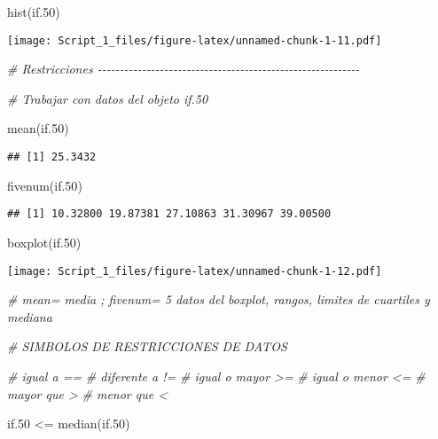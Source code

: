 \documentclass[
]{article}
\newenvironment{Shaded}{\begin{snugshade}}{\end{snugshade}}
\newcommand{\CommentTok}[1]{\textcolor[rgb]{0.56,0.35,0.01}{\textit{#1}}}
\newcommand{\FloatTok}[1]{\textcolor[rgb]{0.00,0.00,0.81}{#1}}
\newcommand{\FunctionTok}[1]{\textcolor[rgb]{0.00,0.00,0.00}{#1}}
\newcommand{\NormalTok}[1]{#1}
\newcommand{\SpecialCharTok}[1]{\textcolor[rgb]{0.00,0.00,0.00}{#1}}
\begin{document}
\begin{Shaded}
\begin{Highlighting}[]
\FunctionTok{hist}\NormalTok{(if}\FloatTok{.50}\NormalTok{)}
\end{Highlighting}
\end{Shaded}

\texttt{[image: Script\_1\_files/figure-latex/unnamed-chunk-1-11.pdf]}

\begin{Shaded}
\begin{Highlighting}[]
\CommentTok{\# Restricciones {-}{-}{-}{-}{-}{-}{-}{-}{-}{-}{-}{-}{-}{-}{-}{-}{-}{-}{-}{-}{-}{-}{-}{-}{-}{-}{-}{-}{-}{-}{-}{-}{-}{-}{-}{-}{-}{-}{-}{-}{-}{-}{-}{-}{-}{-}{-}{-}{-}{-}{-}{-}{-}{-}{-}{-}{-}{-}{-}}

\CommentTok{\# Trabajar con datos del objeto if.50}

\FunctionTok{mean}\NormalTok{(if}\FloatTok{.50}\NormalTok{)}
\end{Highlighting}
\end{Shaded}

\begin{verbatim}
## [1] 25.3432
\end{verbatim}

\begin{Shaded}
\begin{Highlighting}[]
\FunctionTok{fivenum}\NormalTok{(if}\FloatTok{.50}\NormalTok{)}
\end{Highlighting}
\end{Shaded}

\begin{verbatim}
## [1] 10.32800 19.87381 27.10863 31.30967 39.00500
\end{verbatim}

\begin{Shaded}
\begin{Highlighting}[]
\FunctionTok{boxplot}\NormalTok{(if}\FloatTok{.50}\NormalTok{)}
\end{Highlighting}
\end{Shaded}

\texttt{[image: Script\_1\_files/figure-latex/unnamed-chunk-1-12.pdf]}

\begin{Shaded}
\begin{Highlighting}[]
\CommentTok{\# mean= media   ;   fivenum= 5 datos del boxplot, rangos, limites de cuartiles y mediana}

\CommentTok{\# SIMBOLOS DE RESTRICCIONES DE DATOS}

\CommentTok{\# igual a ==}
\CommentTok{\# diferente a !=}
\CommentTok{\# igual o mayor \textgreater{}=}
\CommentTok{\# igual o menor \textless{}=}
\CommentTok{\# mayor que \textgreater{}}
\CommentTok{\# menor que \textless{}}

\NormalTok{if}\FloatTok{.50} \SpecialCharTok{\textless{}=} \FunctionTok{median}\NormalTok{(if}\FloatTok{.50}\NormalTok{)}
\end{Highlighting}
\end{Shaded}
\end{document}

